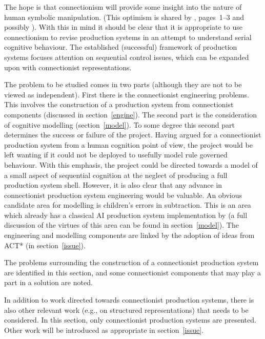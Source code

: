 The hope is that connectionism will provide some insight into
the nature of human symbolic manipulation. (This optimism is
shared by , pages~1--3 and possibly
). With this in mind it should be clear that it is
appropriate to use connectionism to revise  production systems in an
attempt to understand serial cognitive behaviour.  The established
(successful) framework of production systems focuses attention on
sequential control issues, which can be expanded upon with
connectionist representations.



The problem to be studied comes in two parts (although they are not to
be viewed as independent).  First there is the connectionist
engineering problems.  This involves the construction of a production
system from connectionist components (discussed in
section~\ref{engine}).  The second part is the consideration of
cognitive modelling (section~\ref{model}).  To some degree this second
part determines the success or failure of the project. Having argued
for a connectionist production system from a human cognition point of
view, the project would be left wanting if it could not be deployed to
usefully model rule governed behaviour. With this emphasis, the
project could be directed towards a model of a small aspect of
sequential cognition at the neglect of producing a full production
system shell.  However, it is also clear that any advance in
connectionist production system engineering would be valuable. An
obvious candidate area for modelling is children's errors in
subtraction.  This is an area which already has a classical AI
production system implementation by 
(a full discussion of the virtues of this area can be found in
section~\ref{model}).  The engineering and modelling components are
linked by the adoption of ideas from ACT* (in section~\ref{issue}).

\label{engine}

The problems surrounding the construction of a connectionist
production system are identified in this section, and some
connectionist components that may play a part in a solution are
noted.

\label{pwork}

In addition to work directed towards connectionist production systems,
there is also other relevant work (e.g., on structured representations)
that needs to be considered. In this section, only connectionist
production systems are presented.  Other work will be introduced as
appropriate in section~\ref{issue}.

